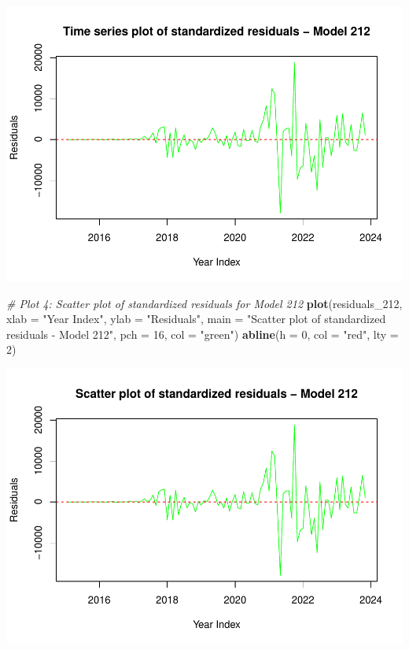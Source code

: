 \documentclass[
]{book}
\newenvironment{Shaded}{\begin{snugshade}}{\end{snugshade}}
\newcommand{\AttributeTok}[1]{\textcolor[rgb]{0.13,0.29,0.53}{#1}}
\newcommand{\CommentTok}[1]{\textcolor[rgb]{0.56,0.35,0.01}{\textit{#1}}}
\newcommand{\DecValTok}[1]{\textcolor[rgb]{0.00,0.00,0.81}{#1}}
\newcommand{\FunctionTok}[1]{\textcolor[rgb]{0.13,0.29,0.53}{\textbf{#1}}}
\newcommand{\NormalTok}[1]{#1}
\newcommand{\StringTok}[1]{\textcolor[rgb]{0.31,0.60,0.02}{#1}}
\begin{document}
\includegraphics{bookdown-demo_files/figure-latex/unnamed-chunk-48-3.pdf}

\begin{Shaded}
\begin{Highlighting}[]
\CommentTok{\# Plot 4: Scatter plot of standardized residuals for Model 212}
\FunctionTok{plot}\NormalTok{(residuals\_212,}
     \AttributeTok{xlab =} \StringTok{"Year Index"}\NormalTok{, }\AttributeTok{ylab =} \StringTok{"Residuals"}\NormalTok{,}
     \AttributeTok{main =} \StringTok{"Scatter plot of standardized residuals {-} Model 212"}\NormalTok{,}
     \AttributeTok{pch =} \DecValTok{16}\NormalTok{, }\AttributeTok{col =} \StringTok{"green"}\NormalTok{)}
\FunctionTok{abline}\NormalTok{(}\AttributeTok{h =} \DecValTok{0}\NormalTok{, }\AttributeTok{col =} \StringTok{"red"}\NormalTok{, }\AttributeTok{lty =} \DecValTok{2}\NormalTok{)}
\end{Highlighting}
\end{Shaded}

\includegraphics{bookdown-demo_files/figure-latex/unnamed-chunk-48-4.pdf}
\end{document}
